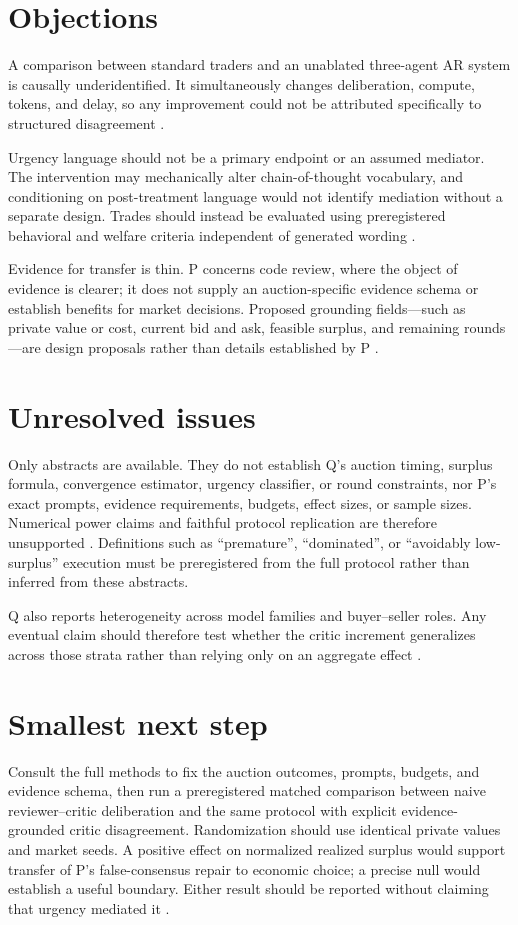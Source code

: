 \documentclass{article}
\begin{document}
\section{Objections}

A comparison between standard traders and an unablated three-agent AR system is causally underidentified. It simultaneously changes deliberation, compute, tokens, and delay, so any improvement could not be attributed specifically to structured disagreement .

Urgency language should not be a primary endpoint or an assumed mediator. The intervention may mechanically alter chain-of-thought vocabulary, and conditioning on post-treatment language would not identify mediation without a separate design. Trades should instead be evaluated using preregistered behavioral and welfare criteria independent of generated wording .

Evidence for transfer is thin. P concerns code review, where the object of evidence is clearer; it does not supply an auction-specific evidence schema or establish benefits for market decisions. Proposed grounding fields---such as private value or cost, current bid and ask, feasible surplus, and remaining rounds---are design proposals rather than details established by P .

\section{Unresolved issues}

Only abstracts are available. They do not establish Q's auction timing, surplus formula, convergence estimator, urgency classifier, or round constraints, nor P's exact prompts, evidence requirements, budgets, effect sizes, or sample sizes. Numerical power claims and faithful protocol replication are therefore unsupported . Definitions such as ``premature'', ``dominated'', or ``avoidably low-surplus'' execution must be preregistered from the full protocol rather than inferred from these abstracts.

Q also reports heterogeneity across model families and buyer--seller roles. Any eventual claim should therefore test whether the critic increment generalizes across those strata rather than relying only on an aggregate effect .

\section{Smallest next step}

Consult the full methods to fix the auction outcomes, prompts, budgets, and evidence schema, then run a preregistered matched comparison between naive reviewer--critic deliberation and the same protocol with explicit evidence-grounded critic disagreement. Randomization should use identical private values and market seeds. A positive effect on normalized realized surplus would support transfer of P's false-consensus repair to economic choice; a precise null would establish a useful boundary. Either result should be reported without claiming that urgency mediated it .
\end{document}

